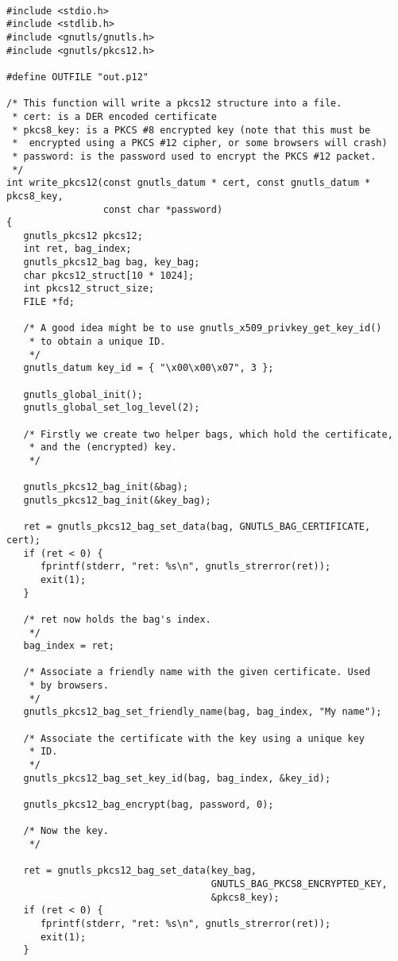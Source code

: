 \begin{verbatim}

#include <stdio.h>
#include <stdlib.h>
#include <gnutls/gnutls.h>
#include <gnutls/pkcs12.h>

#define OUTFILE "out.p12"

/* This function will write a pkcs12 structure into a file.
 * cert: is a DER encoded certificate
 * pkcs8_key: is a PKCS #8 encrypted key (note that this must be
 *  encrypted using a PKCS #12 cipher, or some browsers will crash)
 * password: is the password used to encrypt the PKCS #12 packet.
 */
int write_pkcs12(const gnutls_datum * cert, const gnutls_datum * pkcs8_key,
                 const char *password)
{
   gnutls_pkcs12 pkcs12;
   int ret, bag_index;
   gnutls_pkcs12_bag bag, key_bag;
   char pkcs12_struct[10 * 1024];
   int pkcs12_struct_size;
   FILE *fd;

   /* A good idea might be to use gnutls_x509_privkey_get_key_id()
    * to obtain a unique ID.
    */
   gnutls_datum key_id = { "\x00\x00\x07", 3 };

   gnutls_global_init();
   gnutls_global_set_log_level(2);

   /* Firstly we create two helper bags, which hold the certificate,
    * and the (encrypted) key.
    */

   gnutls_pkcs12_bag_init(&bag);
   gnutls_pkcs12_bag_init(&key_bag);

   ret = gnutls_pkcs12_bag_set_data(bag, GNUTLS_BAG_CERTIFICATE, cert);
   if (ret < 0) {
      fprintf(stderr, "ret: %s\n", gnutls_strerror(ret));
      exit(1);
   }

   /* ret now holds the bag's index.
    */
   bag_index = ret;

   /* Associate a friendly name with the given certificate. Used
    * by browsers.
    */
   gnutls_pkcs12_bag_set_friendly_name(bag, bag_index, "My name");

   /* Associate the certificate with the key using a unique key
    * ID.
    */
   gnutls_pkcs12_bag_set_key_id(bag, bag_index, &key_id);

   gnutls_pkcs12_bag_encrypt(bag, password, 0);

   /* Now the key.
    */

   ret = gnutls_pkcs12_bag_set_data(key_bag,
                                    GNUTLS_BAG_PKCS8_ENCRYPTED_KEY,
                                    &pkcs8_key);
   if (ret < 0) {
      fprintf(stderr, "ret: %s\n", gnutls_strerror(ret));
      exit(1);
   }


\end{verbatim}
